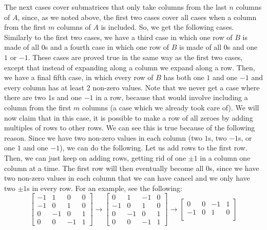 \documentclass{article}
\begin{document}
\begin{description}
        The next cases cover submatrices that only take columns from the last
        $n$ columns of $A$, since, as we noted above, the first two cases cover
        all cases when a column from the first $m$ columns of $A$ is included.
        So, we get the following cases. Similarly to the first two cases, we
        have a third case in which one row of $B$ is made of all $0$s and a
        fourth case in which one row of $B$ is made of all $0$s and one
        $1$ or $-1$. These cases are proved true in the same way as the first
        two cases, except that instead of expanding along a column we expand
        along a row. Then, we have a final fifth case, in which every row of $B$ has
        both one $1$ and one $-1$ and every column has at least 2 non-zero
        values. Note that we never get a case where there are
        two $1$s and one $-1$ in a row, because that would involve including a
        column from the first $m$ columns (a case which we already took care of).
        We will now claim that in this case, it is possible to make a row of
        all zeroes by adding multiples of rows to other rows. We
        can see this is true because of the following reason. Since we have two
        non-zero values in each column (two $1$s, two $-1$s, or
        one $1$ and one $-1$), we can do the following. Let us add rows to the
        first row. Then, we can just keep on adding rows, getting rid of one
        $\pm1$ in a column one column at a time. The first row will then eventually become all $0$s,
        since we have two non-zero values in each column that we can have cancel
        and we only have two $\pm1$s in every row.
        For an example, see the following:
        \[
        \begin{bmatrix}
        -1 & 1 & 0 & 0\\
        -1 & 0 & 1 & 0\\
         0 & -1 & 0 & 1\\
         0 & 0 & -1 & 1
        \end{bmatrix} \rightarrow
        \begin{bmatrix}
         0 & 1 & -1 & 0\\
        -1 & 0 & 1 & 0\\
         0 & -1 & 0 & 1\\
         0 & 0 & -1 & 1
        \end{bmatrix} \rightarrow
        \begin{bmatrix}
         0 & 0 & -1 & 1\\
        -1 & 0 & 1 & 0\\

\end{bmatrix}\]
\end{description}
\end{document}

